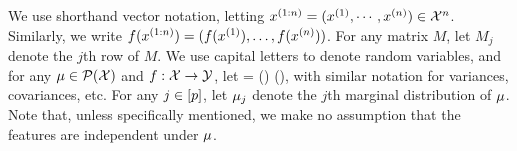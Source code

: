 %
%
%
%
%
%
%
%
%
We use shorthand vector notation, letting $x^{(1:n)} = (x^{(1)},\cdots,x^{(n)}) \in \mathcal{X}^n$. 
%
%
Similarly, we write $f(x^{(1:n)}) = (f(x^{(1)}),\dots,f(x^{(n)}))$.
For any matrix $M$, let $M_j$ denote the $j$th row of $M$.
We use capital letters to denote random variables, and 
for any $\mu\in\mathcal{P}(\mathcal{X})$ and $f:\mathcal{X}\to\mathcal{Y}$, let 
\*[
    \EE_{\covobs\sim\covdist}[\model(\covobs)]
    = \int \model(\covval) \covdist(\dee \covval),
\]
with similar notation for variances, covariances, etc.
For any $j\in[p]$, let $\mu_{j}$ denote the $j$th marginal distribution of $\mu$.
Note that, unless specifically mentioned, we make no assumption that the features are independent under $\mu$.

